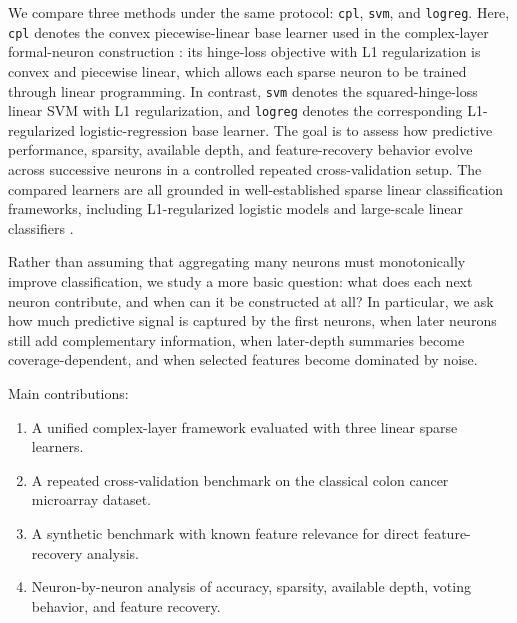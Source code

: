 We compare three methods under the same protocol:
\texttt{cpl}, \texttt{svm}, and \texttt{logreg}. Here, \texttt{cpl} denotes the convex piecewise-linear
base learner used in the complex-layer formal-neuron construction \cite{bobrowski2021,bobrowski2022}: its
hinge-loss objective with L1 regularization is convex and piecewise linear, which allows each sparse neuron to
be trained through linear programming. In contrast,
\texttt{svm} denotes the squared-hinge-loss linear SVM with L1 regularization, and \texttt{logreg} denotes
the corresponding L1-regularized logistic-regression base learner.
The goal is to assess how predictive performance, sparsity,
available depth, and feature-recovery behavior evolve across successive neurons in a controlled repeated
cross-validation setup.
The compared learners are all grounded in well-established sparse linear classification frameworks, including
L1-regularized logistic models and large-scale linear classifiers \cite{friedman2010glmnet,fan2008liblinear}.

Rather than assuming that aggregating many neurons must monotonically improve classification, we study a more
basic question: what does each next neuron contribute, and when can it be constructed at all? In particular,
we ask how much predictive signal is captured by the first neurons, when later neurons still add complementary
information, when later-depth summaries become coverage-dependent, and when selected features become dominated
by noise.

Main contributions:
\begin{enumerate}[noitemsep]
\item A unified complex-layer framework evaluated with three linear sparse learners.
\item A repeated cross-validation benchmark on the classical colon cancer microarray dataset.
\item A synthetic benchmark with known feature relevance for direct feature-recovery analysis.
\item Neuron-by-neuron analysis of accuracy, sparsity, available depth, voting behavior, and feature recovery.
\end{enumerate}
